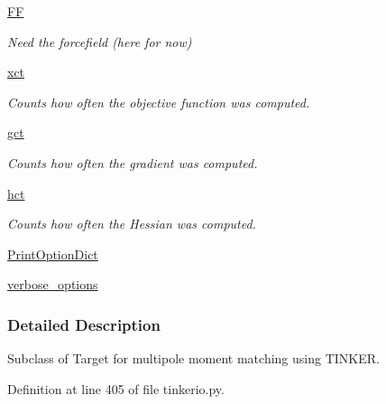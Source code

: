 \begin{DoxyCompactItemize}
\hyperlink{classforcebalance_1_1target_1_1Target_a796dc30a19a60c63fb43b088d40a963f}{\-F\-F}
\begin{DoxyCompactList}\small\item\em \-Need the forcefield (here for now) \end{DoxyCompactList}\item 
\hyperlink{classforcebalance_1_1target_1_1Target_ad4cd0ab38d8fc97d3e7a6e22ce130a16}{xct}
\begin{DoxyCompactList}\small\item\em \-Counts how often the objective function was computed. \end{DoxyCompactList}\item 
\hyperlink{classforcebalance_1_1target_1_1Target_aff6e42b84dd8eb5a4dc3b47aa58bc64c}{gct}
\begin{DoxyCompactList}\small\item\em \-Counts how often the gradient was computed. \end{DoxyCompactList}\item 
\hyperlink{classforcebalance_1_1target_1_1Target_ae929918b7e695a99d7ec946d06d793e1}{hct}
\begin{DoxyCompactList}\small\item\em \-Counts how often the \-Hessian was computed. \end{DoxyCompactList}\item 
\hyperlink{classforcebalance_1_1BaseClass_afc6659278497d7245bc492ecf405ccae}{\-Print\-Option\-Dict}
\item 
\hyperlink{classforcebalance_1_1BaseClass_afd68efa29ccd2f320f4cf82198214aac}{verbose\-\_\-options}
\end{DoxyCompactItemize}


\subsubsection{\-Detailed \-Description}
\-Subclass of \-Target for multipole moment matching using \-T\-I\-N\-K\-E\-R. 



\-Definition at line 405 of file tinkerio.\-py.



